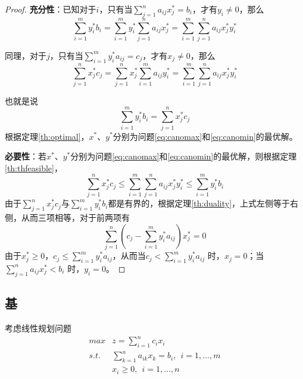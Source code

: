 \begin{proof}
\textbf{充分性}：已知对于$i$，只有当$\sum\limits_{j=1}^n a_{ij} x_j^* = b_i$，才有$y_i\neq 0$，那么
\begin{equation}
\sum\limits_{i=1}^m y_i^* b_i=\sum\limits_{i=1}^m y_i^* \sum\limits_{j=1}^n a_{ij} x_j^* = \sum\limits_{i=1}^m \sum\limits_{j=1}^n a_{ij} x_j^* y_i^*
\end{equation}

同理，对于$j$，只有当$\sum\limits_{i=1}^m y_i^* a_{ij} = c_j$，才有$x_j\neq 0$，那么
\begin{equation}
\sum\limits_{j=1}^n x_j^* c_j = \sum\limits_{j=1}^n x_j^* \sum\limits_{i=1}^m a_{ij} y_i^* = \sum\limits_{i=1}^m \sum\limits_{j=1}^n a_{ij} x_j^* y_i^*
\end{equation}

也就是说
\begin{equation}
\sum\limits_{i=1}^m y_i^* b_i = \sum\limits_{j=1}^n x_j^* c_j
\end{equation}
根据定理\ref{th:optimal}，$x^*$、$y^*$分别为问题\eqref{eq:canomax}和\eqref{eq:canomin}的最优解。

\textbf{必要性}：若$x^*$、$y^*$分别为问题\eqref{eq:canomax}和\eqref{eq:canomin}的最优解，则根据定理\ref{th:thfeasible}，
\[
    \sum\limits_{j=1}^n x_j^* c_j \le \sum\limits_{i=1}^m \sum\limits_{j=1}^n a_{ij} x_j^* y_i^* \le \sum\limits_{i=1}^m y_i^* b_i
\]
由于$\sum\limits_{j=1}^n x_j^* c_j$与$\sum\limits_{i=1}^m y_i^* b_i$都是有界的，根据定理\ref{th:duality}，上式左侧等于右侧，从而三项相等，对于前两项有
\[
    \sum\limits_{j=1}^n (c_j - \sum\limits_{i=1}^m y_i^* a_{ij}) x_j^* = 0
\]
由于$x_j^*\ge 0$，$c_j\le \sum\limits_{i=1}^m y_i^* a_{ij}$，从而当$c_j< \sum\limits_{i=1}^m y_i^* a_{ij}$ 时，$x_j=0$；当$\sum\limits_{j=1}^n a_{ij} x_j^* < b_i$ 时，$y_i=0$。
\end{proof}

\subsection{基}
考虑线性规划问题
\begin{equation}\label{eq:maximum}
    \begin{array}{ll}
        \textit{max} & z = \sum\limits_{i=1}^n c_i x_i\\
        \textit{s.t.} & \sum\limits_{k=1}^n a_{ik} x_k = b_i, ~~i = 1,\ldots,m\\
         & x_i \ge 0, ~~i = 1,\ldots,n
    \end{array}
\end{equation}

